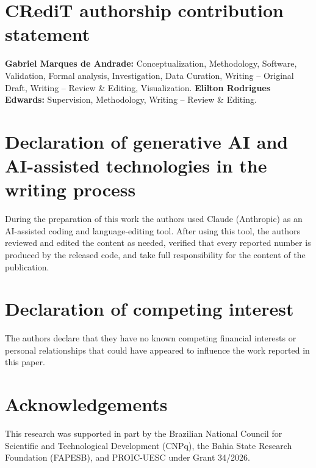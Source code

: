 \documentclass[a4paper,fleqn]{cas-dc}
\begin{document}
\section*{CRediT authorship contribution statement}
\sloppy
\textbf{Gabriel Marques de Andrade:} Conceptualization, Methodology, Software, Validation, Formal analysis, Investigation, Data Curation, Writing -- Original Draft, Writing -- Review \& Editing, Visualization. \textbf{Elilton Rodrigues Edwards:} Supervision, Methodology, Writing -- Review \& Editing.

\section*{Declaration of generative AI and AI-assisted technologies in the writing process}
During the preparation of this work the authors used Claude (Anthropic) as an AI-assisted coding and language-editing tool. After using this tool, the authors reviewed and edited the content as needed, verified that every reported number is produced by the released code, and take full responsibility for the content of the publication.

\fussy
\section*{Declaration of competing interest}
The authors declare that they have no known competing financial interests or personal relationships that could have appeared to influence the work reported in this paper.

\section*{Acknowledgements}
This research was supported in part by the Brazilian National Council for Scientific and Technological Development (CNPq), the Bahia State Research Foundation (FAPESB), and PROIC-UESC under Grant 34/2026.



\end{document}
